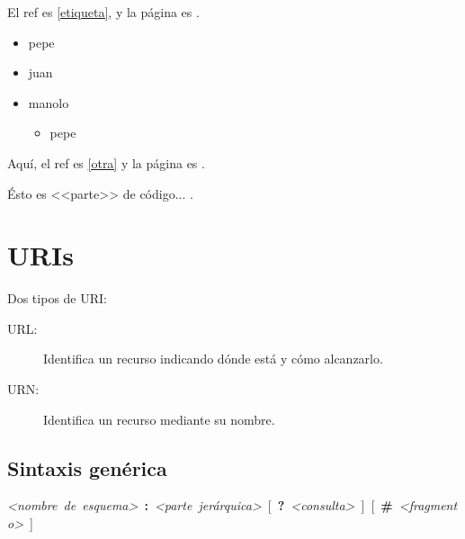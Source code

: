 \documentclass[a4paper,11pt]{memoir}
\begin{document}
El ref es \ref{etiqueta}, y la página es \pageref{etiqueta}.



\begin{itemize}
  \item pepe
  \item juan
  \item manolo
  \begin{itemize}
    \item pepe
  \end{itemize}
\end{itemize}


Aquí, el ref es \ref{otra} y la página es \pageref{otra}.

Ésto es <<parte>> de código...  .

\section{URIs}

Dos tipos de URI:
\begin{description}
    \item [{URL:}] Identifica un recurso indicando dónde está y cómo alcanzarlo.
    \item [{URN:}] Identifica un recurso mediante su nombre.
\end{description}

\subsection{Sintaxis genérica}

\begin{center}
\begingroup
\ttfamily\footnotesize
\emph{<nombre~de~esquema>}~\textbf{:}~\emph{<parte~jerárquica>}~{[}~\textbf{?}~\emph{<consulta>}~{]}~{[}~\textbf{\#}~\emph{<fragmento>}~{]}
\par
\endgroup
\end{center}
\end{document}
